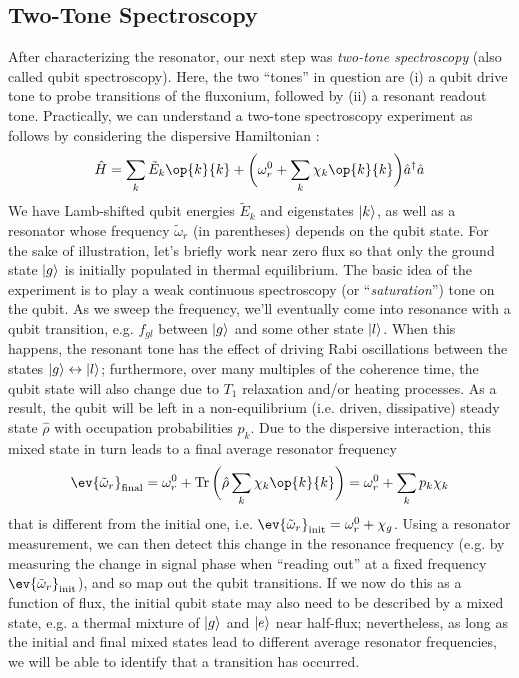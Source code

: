 \newpage
\subsection{Two-Tone Spectroscopy}
After characterizing the resonator, our next step was \textit{two-tone spectroscopy} (also called qubit spectroscopy). Here, the two ``tones'' in question are (i) a qubit drive tone to probe transitions of the fluxonium, followed by (ii) a resonant readout tone. Practically, we can understand a two-tone spectroscopy experiment as follows by considering the dispersive Hamiltonian \cite{zhu2013cQEDfluxonium}:
\begin{equation}
    \hat{H} = \sum_k \tilde{E}_k \op{k}{k} + \bigg(\omega_r^0 + \sum_k \chi_k \op{k}{k}\bigg) \hat{a}^\dagger\hat{a}
\end{equation}
We have Lamb-shifted qubit energies $\tilde{E}_k$ and eigenstates $\lvert k\rangle$, as well as a resonator whose frequency $\tilde{\omega}_r$ (in parentheses) depends on the qubit state. For the sake of illustration, let's briefly work near zero flux so that only the ground state $\lvert g\rangle$ is initially populated in thermal equilibrium. The basic idea of the experiment is to play a weak continuous spectroscopy (or ``\textit{saturation}'') tone on the qubit. As we sweep the frequency, we'll eventually come into resonance with a qubit transition, e.g. $f_{gl}$ between $\lvert g\rangle$ and some other state $\lvert l\rangle$. When this happens, the resonant tone has the effect of driving Rabi oscillations between the states $\lvert g\rangle \leftrightarrow \lvert l\rangle$; furthermore, over many multiples of the coherence time, the qubit state will also change due to $T_1$ relaxation and/or heating processes. As a result, the qubit will be left in a non-equilibrium (i.e. driven, dissipative) steady state $\hat{\rho}$ with occupation probabilities $p_k$. Due to the dispersive interaction, this mixed state in turn leads to a final average resonator frequency 
\begin{equation}
    \ev{\tilde{\omega}_r}_{\rm final} = \omega_r^0 + \Tr\bigg(\hat{\rho} \sum_k \chi_k \op{k}{k}\bigg) = \omega_r^0 + \sum_k p_k \chi_k
\end{equation}
that is different from the initial one, i.e. $\ev{\tilde{\omega}_r}_{\rm init} = \omega_r^0 + \chi_g$. Using a resonator measurement, we can then detect this change in the resonance frequency (e.g. by measuring the change in signal phase when ``reading out'' at a fixed frequency $\ev{\tilde{\omega}_r}_{\rm init}$), and so map out the qubit transitions. If we now do this as a function of flux, the initial qubit state may also need to be described by a mixed state, e.g. a thermal mixture of $\lvert g\rangle$ and $\lvert e\rangle$ near half-flux; nevertheless, as long as the initial and final mixed states lead to different average resonator frequencies, we will be able to identify that a transition has occurred. 

